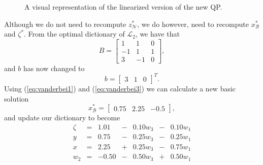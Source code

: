 \begin{figure}[h!]
\centering

\caption{A visual representation of the linearized version of the new QP.}
\label{fig:prac1}
\end{figure}

Although we do not need to recompute $z_{\mathcal{N}}^*$, we do however,
need to recompute $x_{\mathcal{B}}^*$ and $\zeta^*$.
From the optimal dictionary of $\mathcal{L}_2$, we have that
\[
B = 
\left[
\begin{array}{rrr}
     1 &  1 & 0 \\
    -1 &  1 & 1 \\
     3 & -1 & 0
\end{array}
\right],
\]
and $b$ has now changed to
\[
b = \left[
\begin{array}{rrr}
    3 & 1 & 0
\end{array}
\right]^T.
\]
Using (\ref{eq:vanderbei1}) and (\ref{eq:vanderbei3}) we can calculate a new
basic solution
\[
x_{\mathcal{B}}^* =
\left[
\begin{array}{ccc}
    0.75 & 2.25 & -0.5
\end{array}
\right],
\]
and update our dictionary to become
\[
    \begin{array}{rcrcrcr}
        \zeta &=& 1.01 &-& 0.10 w_3 &-& 0.10 w_1 \\ \hline
            y &=& 0.75 &-& 0.25 w_3 &-& 0.25 w_1 \\
            x &=& 2.25 &+& 0.25 w_3 &-& 0.75 w_1 \\
          w_2 &=&-0.50 &-& 0.50 w_3 &+& 0.50 w_1
    \end{array}
\]

